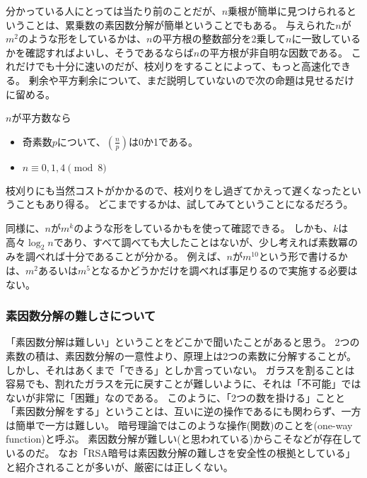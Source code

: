 
分かっている人にとっては当たり前のことだが、$n$乗根が簡単に見つけられるということは、累乗数の素因数分解が簡単ということでもある。
与えられた$n$が$m^2$のような形をしているかは、$n$の平方根の整数部分を2乗して$n$に一致しているかを確認すればよいし、そうであるならば$n$の平方根が非自明な因数である。
これだけでも十分に速いのだが、枝刈りをすることによって、もっと高速化できる。
剰余や平方剰余について、まだ説明していないので次の命題は見せるだけに留める。

\begin{Prop}{}{}
$n$が平方数なら
\begin{itemize}
 \item 奇素数$p$について、$\left(\frac{n}{p}\right)$は0か1である。
 \item $n \equiv 0,1,4 \pmod{8}$
\end{itemize}
\end{Prop}

枝刈りにも当然コストがかかるので、枝刈りをし過ぎてかえって遅くなったということもあり得る。
どこまでするかは、試してみてということになるだろう。


同様に、$n$が$m^k$のような形をしているかもを使って確認できる。
しかも、$k$は高々$\log_2{n}$であり、すべて調べても大したことはないが、少し考えれば素数冪のみを調べれば十分であることが分かる。
例えば、$n$が$m^{10}$という形で書けるかは、$m^2$あるいは$m^5$となるかどうかだけを調べれば事足りるので実施する必要はない。


\subsubsection{素因数分解の難しさについて}
「素因数分解は難しい」ということをどこかで聞いたことがあると思う。
2つの素数の積は、素因数分解の一意性より、原理上は2つの素数に分解することが。
しかし、それはあくまで「できる」としか言っていない。
ガラスを割ることは容易でも、割れたガラスを元に戻すことが難しいように、それは「不可能」ではないが非常に「困難」なのである。
このように、「2つの数を掛ける」ことと「素因数分解をする」ということは、互いに逆の操作であるにも関わらず、一方は簡単で一方は難しい。
暗号理論ではこのような操作(関数)のことを(one-way function)と呼ぶ。
素因数分解が難しい(と思われている)からこそなどが存在しているのだ。
なお「RSA暗号は素因数分解の難しさを安全性の根拠としている」と紹介されることが多いが、厳密には正しくない。

